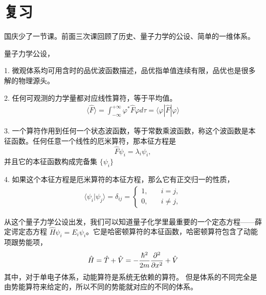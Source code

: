 
\section{复习}
国庆少了一节课。前面三次课回顾了历史、量子力学的公设、简单的一维体系。

量子力学公设，

1. 微观体系均可用含时的品优波函数描述，品优指单值连续有限，品优也是很多解的物理源头。

2. 任何可观测的力学量都对应线性算符，等于平均值。
\begin{eqnarray}
    \langle\hat{F}\rangle=\int_{-\infty}^{+\infty} \varphi^* \hat{F} \varphi d \tau=\langle\varphi|\hat{F}| \varphi\rangle
\end{eqnarray}

3. 一个算符作用到任何一个状态波函数，等于常数乘波函数，称这个波函数是本征函数。任何任意一个线性的厄米算符，那本征方程是
\begin{equation}
    \hat F \psi_i = \lambda_i \psi_i,
\end{equation}
并且它的本征函数构成完备集 $\{\psi_i\}$

4. 如果这个本征方程是厄米算符的本征方程，那么它有正交归一的性质，
\begin{align}
    \langle\psi_i | \psi_j \rangle = \delta_{ij} = \begin{cases}
        1, \quad &i = j, \\
        0, \quad &i\neq j,
    \end{cases}
\end{align}


从这个量子力学公设出发，我们可以知道量子化学里最重要的一个定态方程——薛定谔定态方程 $\hat H \psi_i = E_i \psi_i$。它是哈密顿算符的本征函数，哈密顿算符包含了动能项跟势能项，
\begin{eqnarray}
    \hat H = \hat T + \hat V = - \frac{\hbar^2}{2m}\pdv[2]{x} + \hat V
\end{eqnarray}
其中，对于单电子体系，动能算符是系统无依赖的算符。
但是体系的不同完全是由势能算符来给定的，所以不同的势能就对应的不同的体系。

